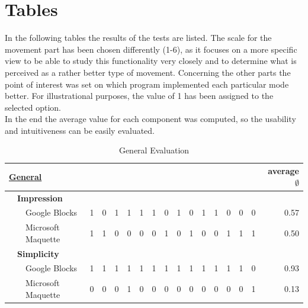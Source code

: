 \documentclass{report}
\begin{document}
	\section{Tables}
	\startsection	
		In the following tables the results of the tests are listed. The scale for the movement part has been chosen differently (1-6), as it focuses on a more specific view to be able to study this functionality very closely and to determine what is perceived as a rather better type of movement. Concerning the other parts the point of interest was set on which program implemented each particular mode better. For illustrational purposes, the value of 1 has been assigned to the selected option. \\
		In the end the average value for each component was computed, so the usability and intuitiveness can be easily evaluated. \\		
		\begin{table}[H]
			\begin{tabular}{@{}|lll|llllllllllllll|r|@{}}
				\hline
				\multicolumn{3}{|l|}{\textbf{\underline{General}}} & & & & & & & & & & & & & & & \textbf{average $\emptyset$} \\ \hline
				& \multicolumn{2}{l|}{\textbf{Impression}} & & & & & & & & & & & & & & &\\ \hline
				& & Google Blocks & 1 & 0 & 1 & 1 & 1 & 1 & 0 & 1 & 0 & 1 & 1 & 0 & 0 & 0 & 0.57 \\
				& & Microsoft Maquette & 1 & 1 & 0 & 0 & 0 & 0 & 1 & 0 & 1 & 0 & 0 & 1 & 1 & 1 & 0.50 \\ \hline
				
				& \multicolumn{2}{l|}{\textbf{Simplicity}} & & & & & & & & & & & & & & &\\ \hline
				& & Google Blocks & 1 & 1 & 1 & 1 & 1 & 1 & 1 & 1 & 1 & 1 & 1 & 1 & 1 & 0 & 0.93 \\
				& & Microsoft Maquette & 0 & 0 & 0 & 1 & 0 & 0 & 0 & 0 & 0 & 0 & 0 & 0 & 0 & 1 & 0.13 \\ \hline
			\end{tabular}
			\caption{General Evaluation}
			\label{tab:tab3.1}
		\end{table}
		
\end{document}
